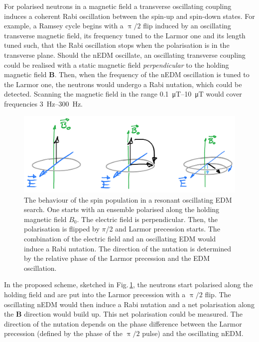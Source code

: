 For polarised neutrons in a magnetic field a transverse oscillating coupling induces a coherent Rabi oscillation between the spin-up and spin-down states.
For example, a Ramsey cycle begins with a $\uppi/2$ flip induced by an oscillating transverse magnetic field, its frequency tuned to the Larmor one and its length tuned such, that the Rabi oscillation stops when the polarisation is in the transverse plane. Should the nEDM oscillate, an oscillating transverse coupling could be realised with a static magnetic field \emph{perpendicular} to the holding magnetic field $\mathbf{B}$. Then, when the frequency of the nEDM oscillation is tuned to the Larmor one, the neutrons would undergo a Rabi nutation, which could be detected. Scanning the magnetic field in the range \SIrange[range-phrase=--]{0.1}{10}{\micro\tesla} would cover frequencies \SIrange[range-phrase=--]{3}{300}{\hertz}.

\begin{figure}
  \centering
  \includegraphics[width=\linewidth]{gfx/axions/resonant_effect.png}
  \caption{The behaviour of the spin population in a resonant oscillating EDM search.
  One starts with an ensemble polarised along the holding magnetic field $B_0$.
  The electric field is perpendicular.
  Then, the polarisation is flipped by $\pi$/2 and Larmor precession starts.
  The combination of the electric field and an oscillating EDM would induce a Rabi nutation.
  The direction of the nutation is determined by the relative phase of the Larmor precession and the EDM oscillation.}\label{fig:axions_resonant_effect}
\end{figure}

In the proposed scheme, sketched in Fig.\,\ref{fig:axions_resonant_effect}, the neutrons start polarised along the holding field and are put into the Larmor precession with a $\uppi/2$ flip. The oscillating nEDM would then induce a Rabi nutation and a net polarisation along the $\mathbf{B}$ direction would build up. This net polarisation could be measured. The direction of the nutation depends on the phase difference between the Larmor precession (defined by the phase of the $\uppi/2$ pulse) and the oscillating nEDM\@.

